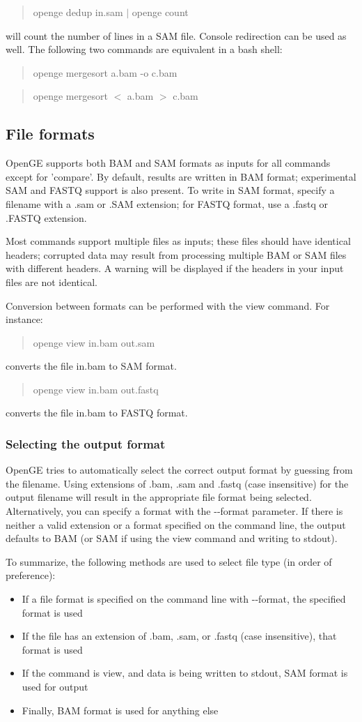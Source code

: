 \documentclass[11pt]{article}
\newcommand {\cmd}[1] {\begin{quote}#1\end{quote}}
\begin{document}
\cmd{openge dedup in.sam $|$ openge count}

will count the number of lines in a SAM file. Console redirection can be used as well. The following two commands are equivalent in a bash shell:

\cmd{openge mergesort a.bam -o c.bam}
\cmd{openge mergesort $<$ a.bam $>$ c.bam}

\subsection {File formats}

OpenGE supports both BAM and SAM formats as inputs for all commands except for 'compare'. By default, results are written in BAM format; experimental SAM and FASTQ support is also present. To write in SAM format, specify a filename with a .sam or .SAM extension; for FASTQ format, use a .fastq or .FASTQ extension.

Most commands support multiple files as inputs; these files should have identical headers; corrupted data may result from processing multiple BAM or SAM files with different headers. A warning will be displayed if the headers in your input files are not identical.

Conversion between formats can be performed with the view command. For instance:
\cmd{openge view in.bam out.sam}
converts the file in.bam to SAM format.

\cmd{openge view in.bam out.fastq}
converts the file in.bam to FASTQ format.

\subsubsection {Selecting the output format}
OpenGE tries to automatically select the correct output format by guessing from the filename. Using extensions of .bam, .sam and .fastq (case insensitive) for the output filename will result in the appropriate file format being selected. Alternatively, you can specify a format with the {-}{-}format parameter. If there is neither a valid extension or a format specified on the command line, the output defaults to BAM (or SAM if using the view command and writing to stdout).

To summarize, the following methods are used to select file type (in order of preference):
\begin{itemize}
\item If a file format is specified on the command line with {-}{-}format, the specified format is used
\item If the file has an extension of .bam, .sam, or .fastq (case insensitive), that format is used
\item If the command is view, and data is being written to stdout, SAM format is used for output
\item Finally, BAM format is used for anything else
\end{itemize}
\end{document}
